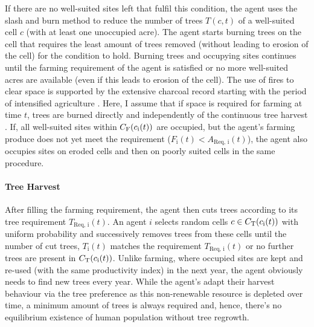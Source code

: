 If there are no well-suited sites left that fulfil this condition, the agent uses the slash and burn method to reduce the number of trees $T(c,t)$ of a well-suited cell $c$ (with at least one unoccupied acre).
The agent starts burning trees on the cell that requires the least amount of trees removed (without leading to erosion of the cell) for the condition to hold.
Burning trees and occupying sites continues until the farming requirement of the agent is satisfied or no more well-suited acres are available (even if this leads to erosion of the cell).
The use of fires to clear space is supported by the extensive charcoal record starting with the period of intensified agriculture \citep{Mieth2015}. 
Here, I assume that if space is required for farming at time $t$, trees are burned directly and independently of the continuous tree harvest .
If, all well-suited sites within $C_{\rm F}(c_{\rm i}(t))$ are occupied, but the agent's farming produce does not yet meet the requirement ($F_\text{i}(t)<A_\text{Req, i}(t)$), the agent also occupies sites on eroded cells and then on poorly suited cells in the same procedure.


\paragraph{Tree Harvest}
After filling the farming requirement, the agent then cuts trees according to its tree requirement $T_\text{Req, i}(t)$.
An agent $i$ selects random cells $c\in C_{\rm T}(c_{\rm i}(t))$ with uniform probability and successively removes trees from these cells until the number of cut trees, $T_\text{i}(t)$ matches the requirement $T_\text{Req, i}(t)$ or no further trees are present in $ C_{\rm T}(c_{\rm i}(t))$. 
Unlike farming, where occupied sites are kept and re-used (with the same productivity index) in the next year, the agent obviously needs to find new trees every year.
While the agent's adapt their harvest behaviour via the tree preference as this non-renewable resource is depleted over time, a minimum amount of trees is always required and, hence, there's no equilibrium existence of human population without tree regrowth.

